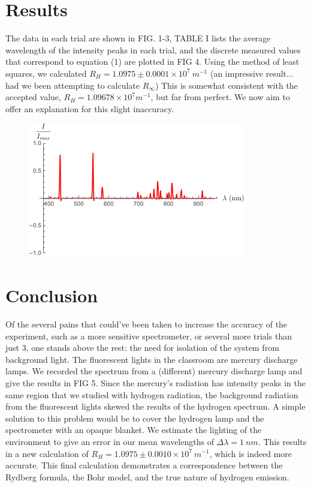 \documentclass[aps,prl,preprint,groupedaddress]{revtex4-2}
\begin{document}
\section{Results}
The data in each trial are shown in FIG. 1-3, TABLE I lists the average wavelength of the intensity peaks in each trial, and the discrete measured values that correspond to equation (1) are plotted in FIG 4. Using the method of least squares, we calculated $R_H=1.0975 \pm 0.0001 \times 10^7 ~\si{m^{-1}}$ (an impressive result... had we been attempting to calculate $R_\infty$) This is somewhat consistent with the accepted value, $R_H = 1.09678 \times 10^7 \si{m^{-1}}$, but far from perfect. We now aim to offer an explanation for this slight inaccuracy.
    \begin{figure}
        \centering
        \includegraphics{res/hg.png}
        \caption{}
    \end{figure}
\section{Conclusion}
Of the several pains that could've been taken to increase the accuracy of the experiment, such as a more sensitive spectrometer, or several more trials than just 3, one stands above the rest: the need for isolation of the system from background light. The fluorescent lights in the classroom are mercury discharge lamps. We recorded the spectrum from a (different) mercury discharge lamp and give the results in FIG 5. Since the mercury's radiation has intensity peaks in the same region that we studied with hydrogen radiation, the background radiation from the fluorescent lights skewed the results of the hydrogen spectrum. A simple solution to this problem would be to cover the hydrogen lamp and the spectrometer with an opaque blanket. We estimate the lighting of the environment to give an error in our mean wavelengths of $\Delta \lambda = 1~\si{nm}$. This results in a new calculation of $R_H = 1.0975 \pm 0.0010 \times 10^7~\si{m^{-1}}$, which is indeed more accurate. This final calculation demonstrates a correspondence between the Rydberg formula, the Bohr model, and the true nature of hydrogen emission.

\printbibliography
\end{document}
